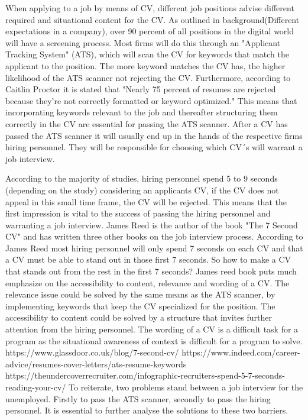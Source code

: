 When applying to a job by means of CV, different job positions advise different required and situational content for the CV.
As outlined in background(Different expectations in a company), over 90 percent of all positions in the digital world will have a screening process.
Most firms will do this through an "Applicant Tracking System" (ATS), which will scan the CV for keywords that match the applicant to the position.
The more keyword matches the CV has, the higher likelihood of the ATS scanner not rejecting the CV.
Furthermore, according to Caitlin Proctor it is stated that "Nearly 75 percent of resumes are rejected because they’re not correctly formatted or keyword optimized."
This means that incorporating keywords relevant to the job and thereafter structuring them correctly in the CV are essential for passing the ATS scanner.
After a CV has passed the ATS scanner it will usually end up in the hands of the respective firms hiring personnel. 
They will be responsible for choosing which CV´s will warrant a job interview.

According to the majority of studies, hiring personnel spend 5 to 9 seconds (depending on the study) considering an applicants CV, if the CV does not appeal in this small time frame, the CV will be rejected.
This means that the first impression is vital to the success of passing the hiring personnel and warranting a job interview.
James Reed is the author of the book "The 7 Second CV" and has written three other books on the job interview process.
According to James Reed most hiring personnel will only spend 7 seconds on each CV and that a CV must be able to stand out in those first 7 seconds.
So how to make a CV that stands out from the rest in the first 7 seconds?
James reed book puts much emphasize on the accessibility to content, relevance and wording of a CV. \cite{7_second_test}
The relevance issue could be solved by the same means as the ATS scanner, by implementing keywords that keep the CV specialized for the position.
The accessibility to content could be solved by a structure that invites further attention from the hiring personnel.
The wording of a CV is a difficult task for a program as the situational awareness of context is difficult for a program to solve.
https://www.glassdoor.co.uk/blog/7-second-cv/
https://www.indeed.com/career-advice/resumes-cover-letters/ats-resume-keywords
https://theundercoverrecruiter.com/infographic-recruiters-spend-5-7-seconds-reading-your-cv/
To reiterate, two problems stand between a job interview for the unemployed.
Firstly to pass the ATS scanner, secondly to pass the hiring personnel.
It is essential to further analyse the solutions to these two barriers. 

